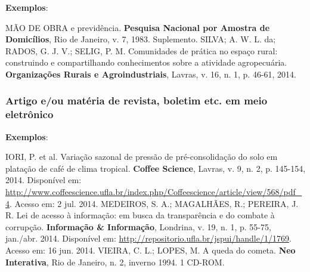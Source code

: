 \begin{exemplomanual}
\textbf{Exemplos}:\\
\begin{singlespace}
MÃO DE OBRA e previdência. \textbf{Pesquisa Nacional por Amostra de
Domicílios}, Rio de Janeiro, v. 7, 1983. Suplemento.
\newline
\newline
SILVA; A. W. L. da; RADOS, G. J. V.; SELIG, P. M. Comunidades de prática no espaço rural: construindo e compartilhando conhecimentos sobre a atividade agropecuária. \textbf{Organizações Rurais e Agroindustriais}, Lavras, v. 16, n. 1, p. 46-61, 2014.
\end{singlespace}
\end{exemplomanual}


\subsubsection{Artigo e/ou matéria de revista, boletim etc. em meio eletrônico}

\begin{flushleft}
\begin{singlespace}
\end{singlespace}
\end{flushleft}

\begin{exemplomanual}
\textbf{Exemplos}:\\
\begin{singlespace}
IORI, P. et al. Variação sazonal de pressão de pré-consolidação do solo em platação de café de clima tropical. \textbf{Coffee Science}, Lavras, v. 9, n. 2, p. 145-154, 2014. Disponível em: \url{http://www.coffeescience.ufla.br/index.php/Coffeescience/article/view/568/pdf_4}. Acesso em: 2 jul. 2014.
\newline
\newline
MEDEIROS, S. A.; MAGALHÃES, R.; PEREIRA, J. R. Lei de acesso à informação: em busca da transparência e do combate à corrupção. \textbf{Informação \& Informação}, Londrina, v. 19, n. 1, p. 55-75, jan./abr. 2014. Disponível em:
\url{http://repositorio.ufla.br/jspui/handle/1/1769}. Acesso em: 16 jun. 2014.
\newline
\newline
VIEIRA, C. L.; LOPES, M. A queda do cometa. \textbf{Neo Interativa}, Rio de Janeiro, n. 2, inverno 1994. 1 CD-ROM.
\end{singlespace}
\end{exemplomanual}


